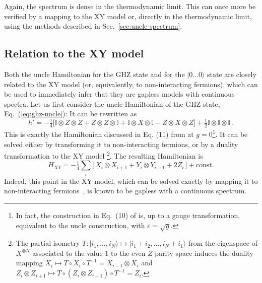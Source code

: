 \documentclass[cmp]{svjour}
\newcommand{\I}{\mathbb{I}}
\newcommand{\ket}[1]{|#1\rangle}
\begin{document}
Again, the spectrum is dense in the thermodynamic limit.  This can once
more be verified by a mapping to the XY model or, directly in the
thermodynamic limit, using the methods described in Sec.~\ref{sec:uncle-spectrum}.











\subsection{Relation to the XY model\label{sec:GHZ-and-XY}}


Both the uncle Hamiltonian for the GHZ state and for the $\ket{0\dots0}$
state are closely related to the XY model (or, equivalently, to
non-interacting fermions), which can be used to immediately infer that
they are gapless models with continuous spectra. Let us first consider the
uncle Hamiltonian of the GHZ state, Eq.~(\ref{eq:ghz-uncle}): It can be
rewritten as
\begin{equation}
    \label{eq:xy-model}
    h'=-\tfrac14\big[\I\otimes Z\otimes Z +
        Z\otimes Z\otimes \I + \I\otimes X\otimes \I -Z
        \otimes X\otimes Z\big] + \tfrac12\I\otimes\I\otimes\I\ .
\end{equation}
This is exactly the Hamiltonian discussed in Eq. (11) from \cite{wolf:phasetransitions-mps} at
$g=0$\footnote{In fact, the construction in Eq.~(10) of \cite{wolf:phasetransitions-mps} is, up
    to a gauge transformation, equivalent to the uncle construction, with
    $\varepsilon=\sqrt{g}$.}. It can be solved either by transforming it to
non-interacting fermions, or by a duality transformation to the XY model
\cite{peschel:entanglemententropy-dualitymap} \footnote{The partial isometry $T:\ket{i_1,\dots, i_N}\mapsto \ket{i_1+i_2,\dots,i_N+i_1}$ from the eigenspace of $X^{\otimes N}$ associated to the value $1$  to the even $Z$ parity space induces the duality mapping $X_i\mapsto T\circ X_i\circ T^{-1}=X_{i-1}\otimes X_{i}$ and $Z_i \otimes
        Z_{i+1}\mapsto T\circ(Z_i \otimes
        Z_{i+1})\circ T^{-1}= Z_i$.}.  The resulting
Hamiltonian is
\[
    H_{XY}=-\tfrac14\sum_{i}\big[\,
        X_i\otimes X_{i+1}+Y_i\otimes Y_{i+1} +2 Z_i\,\big]
    +\mathrm{const.}
\]
Indeed, this point in the XY model, which can be solved exactly by mapping
it to non-interacting fermions~\cite{lieb:XY}, is known to be gapless with
a continuous spectrum.
\end{document}
